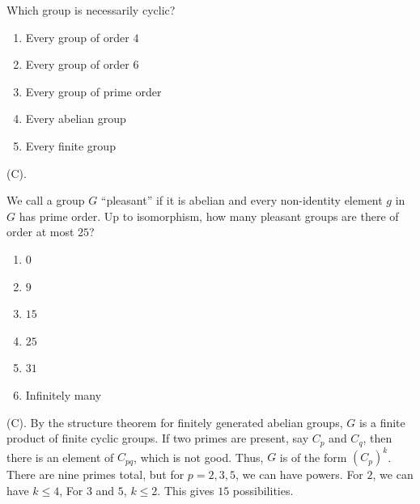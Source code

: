 \begin{exercise}
Which group is necessarily cyclic?
\begin{enumerate}[label=(\Alph*)]
    \item Every group of order $4$
    \item Every group of order $6$
    \item Every group of prime order
    \item Every abelian group
    \item Every finite group
\end{enumerate}
\end{exercise}
\begin{solution}
(C).
\end{solution}

\begin{exercise}
We call a group $G$ ``pleasant'' if it is abelian and every non-identity
element $g$ in $G$ has prime order. Up to isomorphism, how many pleasant
groups are there of order at most $25$?
\begin{enumerate}[label=(\Alph*)]
    \item $0$
    \item $9$
    \item $15$
    \item $25$
    \item $31$
    \item Infinitely many
\end{enumerate}
\end{exercise}
\begin{solution}
(C). By the structure theorem for finitely generated abelian groups, 
$G$ is a finite product of finite cyclic groups. If two primes are present,
say $C_p$ and $C_q$, then there is an element of $C_{pq}$, which is not good.
Thus, $G$ is of the form $(C_p)^k$. There are nine primes total, but for 
$p = 2,3,5$, we can have powers. For $2$, we can have $k \leq 4$, For $3$ and $5$, 
$k \leq 2$. This gives $15$ possibilities.
\end{solution}

